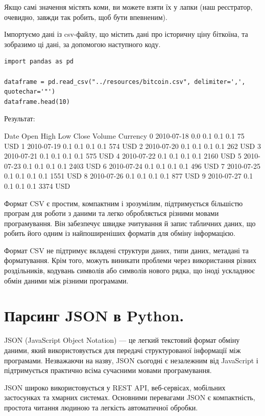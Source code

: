 Якщо самі значення містять коми, ви можете взяти їх у лапки (наш реєстратор, очевидно, завжди 
так робить, щоб бути впевненим).

Імпортуємо дані із csv-файлу, що містить дані про історичну ціну біткоїна, та зобразимо ці 
дані, за допомогою наступного коду.

\begin{lstlisting}
import pandas as pd

dataframe = pd.read_csv("../resources/bitcoin.csv", delimiter=',', quotechar='"')
dataframe.head(10)
\end{lstlisting}

Результат:

\begin{console}
Date	Open	High	Low	Close	Volume	Currency
0	2010-07-18	0.0	0.1	0.1	0.1	75	    USD
1	2010-07-19	0.1	0.1	0.1	0.1	574	    USD
2	2010-07-20	0.1	0.1	0.1	0.1	262	    USD
3	2010-07-21	0.1	0.1	0.1	0.1	575	    USD
4	2010-07-22	0.1	0.1	0.1	0.1	2160	USD
5	2010-07-23	0.1	0.1	0.1	0.1	2403	USD
6	2010-07-24	0.1	0.1	0.1	0.1	496	    USD
7	2010-07-25	0.1	0.1	0.1	0.1	1551	USD
8	2010-07-26	0.1	0.1	0.1	0.1	877	    USD
9	2010-07-27	0.1	0.1	0.1	0.1	3374	USD
\end{console}

Формат CSV є простим, компактним і зрозумілим, підтримується більшістю програм для роботи з даними 
та легко обробляється різними мовами програмування. Він забезпечує швидке зчитування й запис 
табличних даних, що робить його одним із найпоширеніших форматів для обміну інформацією.

 Формат CSV не підтримує вкладені структури даних, типи даних, метадані та форматування. 
Крім того, можуть виникати проблеми через використання різних роздільників, кодувань 
символів або символів нового рядка, що іноді ускладнює обмін даними між різними програмами.





\section{Парсинг JSON в Python.}

JSON (JavaScript Object Notation) — це легкий текстовий формат обміну даними, який використовується 
для передачі структурованої інформації між програмами. Незважаючи на назву, JSON сьогодні є 
незалежним від JavaScript і підтримується практично всіма сучасними мовами програмування.

JSON широко використовується у REST API, веб-сервісах, мобільних застосунках та хмарних системах. 
Основними перевагами JSON є компактність, простота читання людиною та легкість автоматичної обробки.

